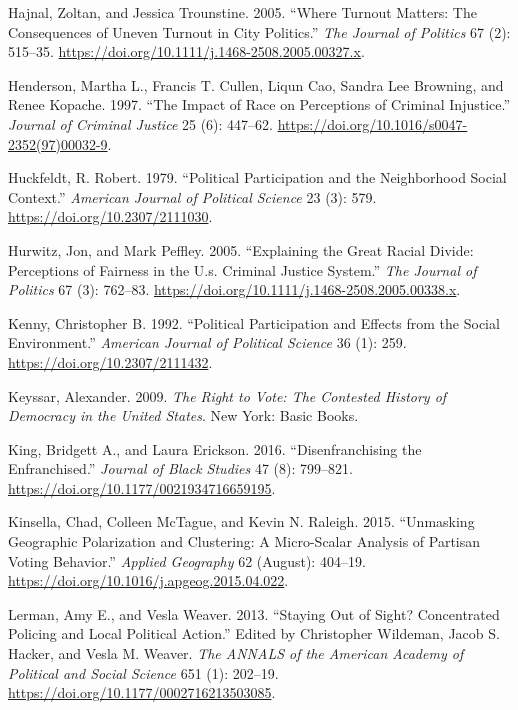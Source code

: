 \documentclass[12pt,]{article}
\begin{document}
\leavevmode\hypertarget{ref-Hajnal2005}{}%
Hajnal, Zoltan, and Jessica Trounstine. 2005. ``Where Turnout Matters: The Consequences of Uneven Turnout in City Politics.'' \emph{The Journal of Politics} 67 (2): 515--35. \url{https://doi.org/10.1111/j.1468-2508.2005.00327.x}.

\leavevmode\hypertarget{ref-Henderson1997}{}%
Henderson, Martha L., Francis T. Cullen, Liqun Cao, Sandra Lee Browning, and Renee Kopache. 1997. ``The Impact of Race on Perceptions of Criminal Injustice.'' \emph{Journal of Criminal Justice} 25 (6): 447--62. \url{https://doi.org/10.1016/s0047-2352(97)00032-9}.

\leavevmode\hypertarget{ref-Huckfeldt1979}{}%
Huckfeldt, R. Robert. 1979. ``Political Participation and the Neighborhood Social Context.'' \emph{American Journal of Political Science} 23 (3): 579. \url{https://doi.org/10.2307/2111030}.

\leavevmode\hypertarget{ref-Hurwitz2005}{}%
Hurwitz, Jon, and Mark Peffley. 2005. ``Explaining the Great Racial Divide: Perceptions of Fairness in the U.s. Criminal Justice System.'' \emph{The Journal of Politics} 67 (3): 762--83. \url{https://doi.org/10.1111/j.1468-2508.2005.00338.x}.

\leavevmode\hypertarget{ref-Kenny1992}{}%
Kenny, Christopher B. 1992. ``Political Participation and Effects from the Social Environment.'' \emph{American Journal of Political Science} 36 (1): 259. \url{https://doi.org/10.2307/2111432}.

\leavevmode\hypertarget{ref-Keyssar2009}{}%
Keyssar, Alexander. 2009. \emph{The Right to Vote: The Contested History of Democracy in the United States}. New York: Basic Books.

\leavevmode\hypertarget{ref-King2016}{}%
King, Bridgett A., and Laura Erickson. 2016. ``Disenfranchising the Enfranchised.'' \emph{Journal of Black Studies} 47 (8): 799--821. \url{https://doi.org/10.1177/0021934716659195}.

\leavevmode\hypertarget{ref-Kinsella2015}{}%
Kinsella, Chad, Colleen McTague, and Kevin N. Raleigh. 2015. ``Unmasking Geographic Polarization and Clustering: A Micro-Scalar Analysis of Partisan Voting Behavior.'' \emph{Applied Geography} 62 (August): 404--19. \url{https://doi.org/10.1016/j.apgeog.2015.04.022}.

\leavevmode\hypertarget{ref-Lerman2013}{}%
Lerman, Amy E., and Vesla Weaver. 2013. ``Staying Out of Sight? Concentrated Policing and Local Political Action.'' Edited by Christopher Wildeman, Jacob S. Hacker, and Vesla M. Weaver. \emph{The ANNALS of the American Academy of Political and Social Science} 651 (1): 202--19. \url{https://doi.org/10.1177/0002716213503085}.
\end{document}
